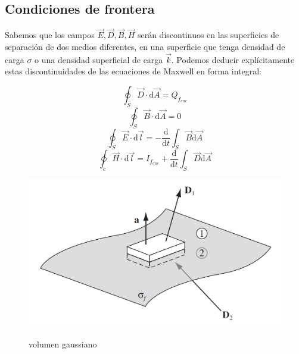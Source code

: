 \documentclass[12pt,a4paper]{article}
\newcommand{\D}{\mathrm{d}}
\begin{document}
\subsection{Condiciones de frontera}

Sabemos que los campos $\vec{E}, \vec{D}, \vec{B}, \vec{H}$ serán discontinuos en las superficies de separación de dos medios diferentes, en una superficie que tenga densidad de carga $\sigma$ o una densidad superficial de carga $\vec{k}$. Podemos deducir explícitamente estas discontinuidades de las ecuaciones de Maxwell en forma  integral:


\begin{equation}
\oint_S \vec{D} \cdot \D \vec{A} =  Q_{f_{enc}} \label{Ec:6.1-1EcMaxInt}
\end{equation}
\begin{equation}
\oint_S \vec{B} \cdot \D \vec{A} =  0  \label{Ec:6.1-2EcMaxInt}
\end{equation}
\begin{equation}
\oint_S \vec{E} \cdot \D \vec{l} =  - \dfrac{\D }{\D t} \int_S \vec{B} \D \vec{A} \label{Ec:6.1-3EcMaxInt}
\end{equation}
\begin{equation}
\oint_c \vec{H} \cdot \D \vec{l} =  I_{f_{enc}} +  \dfrac{\D }{\D t} \int_S \vec{D}\label{Ec:6.1-4EcMaxInt} \D \vec{A}
\end{equation}

\begin{figure}[h!] \centering
\includegraphics[scale=0.3]{condicionesmaxwell1.png}
\label{Fig:6.1}
\caption{volumen gaussiano}
\end{figure}
\end{document}
